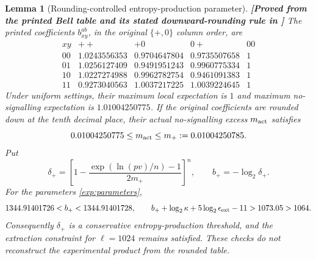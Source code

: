 \documentclass[11pt,a4paper]{article}
\newtheorem{lemma}[theorem]{Lemma}
\theoremstyle{definition}
\theoremstyle{remark}\newtheorem{remark}[theorem]{Remark}
\newcommand{\status}[1]{\textbf{[#1]}\quad}
\begin{document}
\begin{lemma}[Rounding-controlled entropy-production parameter]\label{exp:rounding}
\status{Proved from the printed Bell table and its stated downward-rounding rule in \cite{Bierhorst18}}
The printed coefficients $b_{xy}^{ab}$, in the original $\{+,0\}$ column order, are
\[
\begin{array}{c|rrrr}
 xy & ++ & +0 & 0+ & 00\\\hline
00&1.0243556353&0.9704647804&0.9735507658&1\\
01&1.0256127409&0.9491951243&0.9960775334&1\\
10&1.0227274988&0.9962782754&0.9461091383&1\\
11&0.9273040563&1.0037217225&1.0039224645&1
\end{array}
\]
Under uniform settings, their maximum local expectation is $1$ and maximum no-signalling expectation is $1.01004250775$. If the original coefficients are rounded down at the tenth decimal place, their actual no-signalling excess $m_{\rm act}$ satisfies
\begin{equation}\label{exp:mupper}
 0.01004250775\le m_{\rm act}\le m_+:=0.01004250785.
\end{equation}
Put
\begin{equation}\label{exp:deltaplus}
 \delta_+=\left[1-\frac{\exp(\ln(pv)/n)-1}{2m_+}\right]^n,
 \qquad b_+=-\log_2\delta_+.
\end{equation}
For the parameters \eqref{exp:parameters},
\begin{equation}\label{exp:numericalintervals}
 1344.91401726<b_+<1344.91401728,
 \qquad
 b_++\log_2\kappa+5\log_2\epsilon_{\rm ext}-11>1073.05>1064.
\end{equation}
Consequently $\delta_+$ is a conservative entropy-production threshold, and the extraction constraint for $\ell=1024$ remains satisfied. These checks do not reconstruct the experimental product from the rounded table.
\end{lemma}
\end{document}
